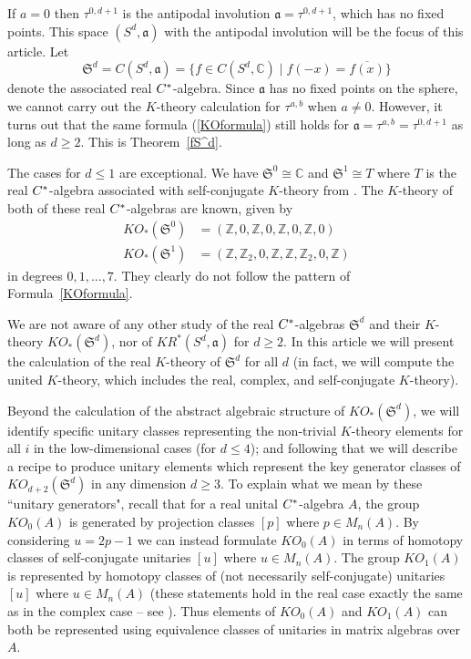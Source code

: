 \documentclass[12pt, reqno]{amsart}
\theoremstyle{definition}
\def\C{{\mathbb C}}
\def\Z{{\mathbb Z}}
\newcommand{\fa}{\mathfrak a}
\newcommand{\fS}{\mathfrak S}
\begin{document}
If $a = 0$ then $\tau^{0,d+1}$ is the antipodal involution $\fa = \tau^{0,d+1}$, which has no fixed points. This space $(S^d, \fa)$ with the antipodal involution will be the focus of this article.
Let
\[ \fS^d = C(S^d , \fa) = \{ f \in C(S^d, \C) \mid f(-x) = \overline{f(x)} \} \]
denote the associated real $C \sp *$-algebra. Since $\fa$ has no fixed points on the sphere, we cannot carry out the $K$-theory calculation for $\tau^{a,b}$ when $a \neq 0$. However, it turns out that the same formula (\ref{KOformula}) still holds for 
 $\fa = \tau^{a,b} = \tau^{0,d+1}$ as long as $d \geq 2$. This is Theorem~\ref{fS^d}.
 
The cases for $d \leq 1$ are exceptional. We have $\fS^0 \cong \C$ and $\fS^1 \cong T$ where $T$ is the real $C \sp *$-algebra associated with self-conjugate $K$-theory from \cite{Boer2002}. The $K$-theory of both of these real $C \sp *$-algebras are known, given by
\begin{align*}
KO_*(\fS^0) &= (\Z, 0, \Z, 0, \Z, 0, \Z, 0) \\
KO_*(\fS^1) &= (\Z, \Z_2, 0, \Z, \Z, \Z_2, 0, \Z)
 \end{align*}
in degrees $0, 1, \dots, 7$. They clearly do not follow the pattern of Formula~\ref{KOformula}.

We are not aware of any other study of the real $C \sp *$-algebras $\fS^d$ and their $K$-theory $KO_*(\fS^d)$, nor of $KR^*(S^d, \fa)$ for $d \geq 2$.
In this article we will present the calculation of the real $K$-theory of $\fS^d$ for all $d$ (in fact, we will compute the united $K$-theory, which includes the real, complex, and self-conjugate $K$-theory).

Beyond the calculation of the abstract algebraic structure of $KO_*(\fS^d)$, we will identify specific unitary classes representing the non-trivial $K$-theory elements for all $i$ in the low-dimensional cases (for $d \leq 4$); and following that we will describe a recipe to produce unitary elements which represent the key generator classes of $KO_{d+2}(\fS^d)$ in any dimension $d \geq 3$. To explain what we mean by these ``unitary generators", recall that
for a real unital $C \sp *$-algebra $A$, the group $KO_0(A)$ is generated by projection classes $[p]$ where $p \in M_n(A)$. By considering $u = 2p-1$ we can instead formulate $KO_0(A)$ in terms of homotopy classes of self-conjugate unitaries $[u]$ where $u \in M_n(A)$.
The group $KO_1(A)$ is represented by homotopy classes of (not necessarily self-conjugate) unitaries $[u]$ where $u \in M_n(A)$ (these statements hold in the real case exactly the same as in the complex case -- see \cite{rordambookblue}).  Thus elements of $KO_0(A)$ and $KO_1(A)$ can both be represented using equivalence classes of unitaries in matrix algebras over $A$.
\end{document}
